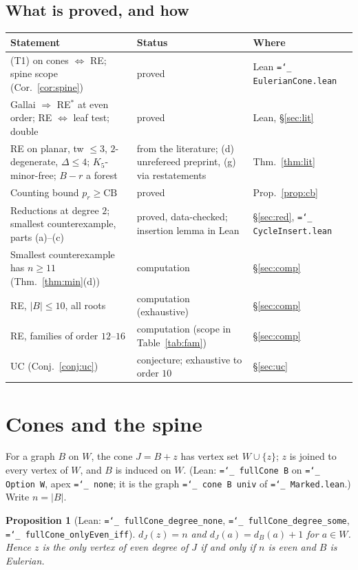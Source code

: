 \documentclass[11pt]{amsart}
\newtheorem{proposition}[theorem]{Proposition}
\theoremstyle{definition}
\newcommand{\pr}{p_r}
\newcommand{\CB}{\mathrm{CB}}
\newcommand{\lean}[1]{\texttt{\hyphenchar\font=`\_ #1}}
\begin{document}
\subsection*{What is proved, and how}
\begin{center}\small
\begin{tabular}{@{}>{\raggedright}p{}>{\raggedright}p{}p{}@{}}
\toprule
Statement & Status & Where \\
\midrule
(T1) on cones $\iff$ RE; spine scope (Cor.~\ref{cor:spine}) & proved & Lean \lean{EulerianCone.lean} \\
Gallai $\Rightarrow$ RE$^*$ at even order; RE $\iff$ leaf test; double & proved & Lean, \S\ref{sec:lit} \\
RE on planar, tw $\le 3$, $2$-degenerate, $\Delta\le4$; $K_5$-minor-free; $B-r$ a forest & from the literature; (d) unrefereed preprint, (g) via restatements & Thm.~\ref{thm:lit} \\
Counting bound $\pr\ge\CB$ & proved & Prop.~\ref{prop:cb} \\
Reductions at degree $2$; smallest counterexample, parts (a)--(c) & proved, data-checked; insertion lemma in Lean & \S\ref{sec:red}, \lean{CycleInsert.lean} \\
Smallest counterexample has $n\ge11$ (Thm.~\ref{thm:min}(d)) & computation & \S\ref{sec:comp} \\
RE, $|B|\le 10$, all roots & computation (exhaustive) & \S\ref{sec:comp} \\
RE, families of order $12$--$16$ & computation (scope in Table~\ref{tab:fam}) & \S\ref{sec:comp} \\
UC (Conj.~\ref{conj:uc}) & conjecture; exhaustive to order $10$ & \S\ref{sec:uc} \\
\bottomrule
\end{tabular}
\end{center}

\section{Cones and the spine}\label{sec:cones}

For a graph $B$ on $W$, the cone $J=B+z$ has vertex set $W\cup\{z\}$; $z$ is joined to every vertex
of $W$, and $B$ is induced on $W$. (Lean: \lean{fullCone B} on \lean{Option W}, apex \lean{none}; it is
the graph \lean{cone B univ} of \lean{Marked.lean}.) Write $n=|B|$.

\begin{proposition}[Lean: \lean{fullCone\_degree\_none}, \lean{fullCone\_degree\_some},
\lean{fullCone\_onlyEven\_iff}]\label{prop:par}
$d_J(z)=n$ and $d_J(a)=d_B(a)+1$ for $a\in W$. Hence $z$ is the only vertex of even degree of $J$ if
and only if $n$ is even and $B$ is Eulerian.
\end{proposition}
\end{document}
